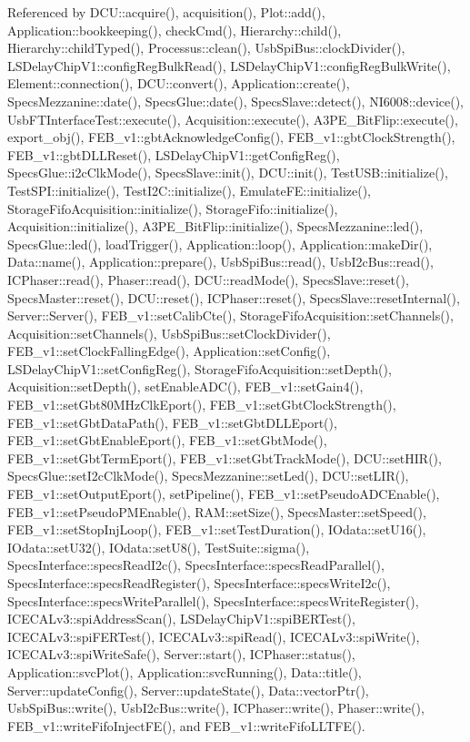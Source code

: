 Referenced by DCU::acquire(), acquisition(), Plot::add(), Application::bookkeeping(), checkCmd(), Hierarchy::child(), Hierarchy::childTyped(), Processus::clean(), UsbSpiBus::clockDivider(), LSDelayChipV1::configRegBulkRead(), LSDelayChipV1::configRegBulkWrite(), Element::connection(), DCU::convert(), Application::create(), SpecsMezzanine::date(), SpecsGlue::date(), SpecsSlave::detect(), NI6008::device(), UsbFTInterfaceTest::execute(), Acquisition::execute(), A3PE\_\-BitFlip::execute(), export\_\-obj(), FEB\_\-v1::gbtAcknowledgeConfig(), FEB\_\-v1::gbtClockStrength(), FEB\_\-v1::gbtDLLReset(), LSDelayChipV1::getConfigReg(), SpecsGlue::i2cClkMode(), SpecsSlave::init(), DCU::init(), TestUSB::initialize(), TestSPI::initialize(), TestI2C::initialize(), EmulateFE::initialize(), StorageFifoAcquisition::initialize(), StorageFifo::initialize(), Acquisition::initialize(), A3PE\_\-BitFlip::initialize(), SpecsMezzanine::led(), SpecsGlue::led(), loadTrigger(), Application::loop(), Application::makeDir(), Data::name(), Application::prepare(), UsbSpiBus::read(), UsbI2cBus::read(), ICPhaser::read(), Phaser::read(), DCU::readMode(), SpecsSlave::reset(), SpecsMaster::reset(), DCU::reset(), ICPhaser::reset(), SpecsSlave::resetInternal(), Server::Server(), FEB\_\-v1::setCalibCte(), StorageFifoAcquisition::setChannels(), Acquisition::setChannels(), UsbSpiBus::setClockDivider(), FEB\_\-v1::setClockFallingEdge(), Application::setConfig(), LSDelayChipV1::setConfigReg(), StorageFifoAcquisition::setDepth(), Acquisition::setDepth(), setEnableADC(), FEB\_\-v1::setGain4(), FEB\_\-v1::setGbt80MHzClkEport(), FEB\_\-v1::setGbtClockStrength(), FEB\_\-v1::setGbtDataPath(), FEB\_\-v1::setGbtDLLEport(), FEB\_\-v1::setGbtEnableEport(), FEB\_\-v1::setGbtMode(), FEB\_\-v1::setGbtTermEport(), FEB\_\-v1::setGbtTrackMode(), DCU::setHIR(), SpecsGlue::setI2cClkMode(), SpecsMezzanine::setLed(), DCU::setLIR(), FEB\_\-v1::setOutputEport(), setPipeline(), FEB\_\-v1::setPseudoADCEnable(), FEB\_\-v1::setPseudoPMEnable(), RAM::setSize(), SpecsMaster::setSpeed(), FEB\_\-v1::setStopInjLoop(), FEB\_\-v1::setTestDuration(), IOdata::setU16(), IOdata::setU32(), IOdata::setU8(), TestSuite::sigma(), SpecsInterface::specsReadI2c(), SpecsInterface::specsReadParallel(), SpecsInterface::specsReadRegister(), SpecsInterface::specsWriteI2c(), SpecsInterface::specsWriteParallel(), SpecsInterface::specsWriteRegister(), ICECALv3::spiAddressScan(), LSDelayChipV1::spiBERTest(), ICECALv3::spiFERTest(), ICECALv3::spiRead(), ICECALv3::spiWrite(), ICECALv3::spiWriteSafe(), Server::start(), ICPhaser::status(), Application::svcPlot(), Application::svcRunning(), Data::title(), Server::updateConfig(), Server::updateState(), Data::vectorPtr(), UsbSpiBus::write(), UsbI2cBus::write(), ICPhaser::write(), Phaser::write(), FEB\_\-v1::writeFifoInjectFE(), and FEB\_\-v1::writeFifoLLTFE().


